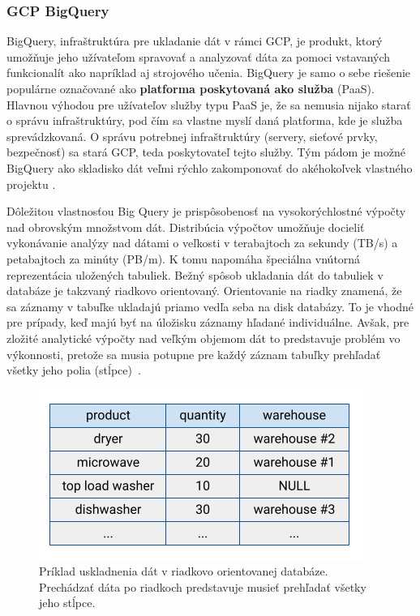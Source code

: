 \subsubsection{GCP BigQuery}

BigQuery, infraštruktúra pre ukladanie dát v rámci GCP, je produkt, ktorý umožňuje jeho užívateľom spravovať a analyzovať dáta za pomoci vstavaných funkcionalít ako napríklad aj strojového učenia.
BigQuery je samo o sebe riešenie populárne označované ako \textbf{platforma poskytovaná ako služba} (PaaS).
Hlavnou výhodou pre užívateľov služby typu PaaS je, že sa nemusia nijako starať o správu infraštruktúry, pod čím sa vlastne myslí daná platforma, kde je služba sprevádzkovaná.
O správu potrebnej infraštruktúry (servery, sieťové prvky, bezpečnosť) sa stará GCP, teda poskytovateľ tejto služby.
Tým pádom je možné BigQuery ako skladisko dát veľmi rýchlo zakomponovať do akéhokoľvek vlastného projektu \cite{google-bq}.

Dôležitou vlastnosťou Big Query je prispôsobenosť na vysokorýchlostné výpočty nad obrovským množstvom dát.
Distribúcia výpočtov umožňuje docieliť vykonávanie analýzy nad dátami o veľkosti v terabajtoch za sekundy (TB/s) a petabajtoch za minúty (PB/m).
K tomu napomáha špeciálna vnútorná reprezentácia uložených tabuliek. 
Bežný spôsob ukladania dát do tabuliek v databáze je takzvaný riadkovo orientovaný.
Orientovanie na riadky znamená, že sa záznamy v tabuľke ukladajú priamo vedľa seba na disk databázy.
To je vhodné pre prípady, keď majú byť na úložisku záznamy hľadané individuálne.
Avšak, pre zložité analytické výpočty nad veľkým objemom dát to predstavuje problém vo výkonnosti, pretože sa musia potupne pre každý záznam tabuľky prehľadať všetky jeho polia \mbox{(stĺpce) \cite{google-bq}}.

\begin{figure}[htb]
\begin{center}
 \includegraphics[scale=0.7]{obrazky-figures/row-oriented-store.png}
 \caption{\centering Príklad uskladnenia dát v riadkovo orientovanej databáze. Prechádzať dáta po riadkoch predstavuje musieť prehľadať všetky jeho stĺpce.}
 \label{img:row-oriented-store}
\end{center}
\end{figure}


